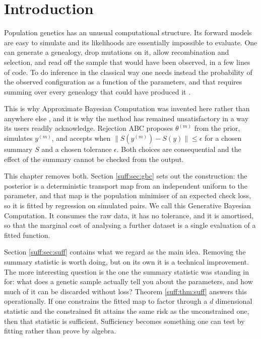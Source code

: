 \section{Introduction}

Population genetics has an unusual computational structure. Its forward models are easy to
simulate and its likelihoods are essentially impossible to evaluate. One can generate a
genealogy, drop mutations on it, allow recombination and selection, and read off the sample
that would have been observed, in a few lines of code. To do inference in the classical way
one needs instead the probability of the observed configuration as a function of the
parameters, and that requires summing over every genealogy that could have produced it
\citep{suff:kingman1982}.

This is why Approximate Bayesian Computation was invented here rather than anywhere else
\citep{suff:tavare1997,suff:pritchard1999}, and it is why the method has remained
unsatisfactory in a way its users readily acknowledge. Rejection ABC proposes $\theta^{(m)}$
from the prior, simulates $y^{(m)}$, and accepts when $\|S(y^{(m)})-S(y)\|\le\epsilon$ for a
chosen summary $S$ and a chosen tolerance $\epsilon$. Both choices are consequential and
the effect of the summary cannot be checked from the output.

This chapter removes both. Section \ref{suff:sec:gbc} sets out the construction: the
posterior is a deterministic transport map from an independent uniform to the parameter, and
that map is the population minimiser of an expected check loss, so it is fitted by regression
on simulated pairs. We call this Generative Bayesian Computation. It consumes the raw data,
it has no tolerance, and it is amortised, so that the marginal cost of analysing a further
dataset is a single evaluation of a fitted function.

Section \ref{suff:sec:suff} contains what we regard as the main idea. Removing the summary
statistic is worth doing, but on its own it is a technical improvement. The more interesting
question is the one the summary statistic was standing in for: what does a genetic sample
actually tell you about the parameters, and how much of it can be discarded without loss?
Theorem \ref{suff:thm:suff} answers this operationally. If one constrains the fitted map to
factor through a $d$ dimensional statistic and the constrained fit attains the same risk as
the unconstrained one, then that statistic is sufficient. Sufficiency becomes something one
can test by fitting rather than prove by algebra.

